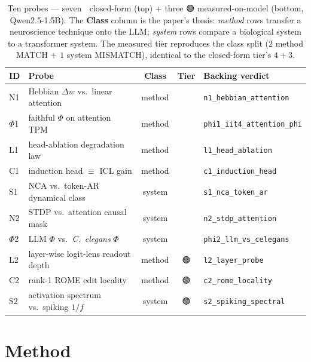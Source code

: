 \documentclass[11pt,a4paper]{article}
\providecommand{\tierBlue}{🔵}
\providecommand{\tierGreen}{🟢}
\begin{document}
\medskip
\begin{table}[h]
\centering
\small
\begin{tabular}{@{}>{\raggedright\arraybackslash}m{0.7cm} >{\raggedright\arraybackslash}m{5.1cm} c c >{\raggedright\arraybackslash}m{3.6cm}@{}}
\toprule
\textbf{ID} & \textbf{Probe} & \textbf{Class} & \textbf{Tier} & \textbf{Backing verdict} \\
\midrule
N1 & Hebbian $\Delta w$ vs.\ linear attention & method   & \tierBlue & \texttt{n1\_hebbian\_attention} \\
$\Phi$1 & faithful $\Phi$ on attention TPM    & method   & \tierBlue & \texttt{phi1\_iit4\_attention\_phi} \\
L1 & head-ablation degradation law            & method   & \tierBlue & \texttt{l1\_head\_ablation} \\
C1 & induction head $\equiv$ ICL gain         & method   & \tierBlue & \texttt{c1\_induction\_head} \\
S1 & NCA vs.\ token-AR dynamical class        & system   & \tierBlue & \texttt{s1\_nca\_token\_ar} \\
N2 & STDP vs.\ attention causal mask          & system   & \tierBlue & \texttt{n2\_stdp\_attention} \\
$\Phi$2 & LLM $\Phi$ vs.\ \emph{C.\ elegans} $\Phi$ & system & \tierBlue & \texttt{phi2\_llm\_vs\_celegans} \\
\midrule
L2 & layer-wise logit-lens readout depth     & method   & \tierGreen & \texttt{l2\_layer\_probe} \\
C2 & rank-1 ROME edit locality                & method   & \tierGreen & \texttt{c2\_rome\_locality} \\
S2 & activation spectrum vs.\ spiking $1/f$   & system   & \tierGreen & \texttt{s2\_spiking\_spectral} \\
\bottomrule
\end{tabular}
\caption{Ten probes --- seven $\tierBlue$ closed-form (top) + three
$\tierGreen$ measured-on-model (bottom, Qwen2.5-1.5B). The \textbf{Class}
column is the paper's thesis: \emph{method} rows transfer a neuroscience
technique onto the LLM; \emph{system} rows compare a biological system to
a transformer system. The measured tier reproduces the class split
($2$ method MATCH $+$ $1$ system MISMATCH), identical to the closed-form
tier's $4{+}3$.}
\label{tab:pipeline}
\end{table}

\section{Method}
\label{sec:method}
\end{document}
